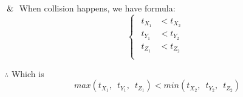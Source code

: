 $\And$ When collision happens,  we have formula:
\[
\left\{
\begin{array}{lr}
\begin{aligned}
t_{X_1} &< t_{X_2}\\
t_{Y_1} &< t_{Y_2}\\
t_{Z_1} &< t_{Z_2}\\
\end{aligned}
\end{array}
\right.
\]

$\therefore$ Which is
\begin{equation}
\label{equ:ray-box-3d-intersection}
max(t_{X_1},\enspace t_{Y_1},\enspace t_{Z_1}) < min(t_{X_2},\enspace t_{Y_2},\enspace t_{Z_2})
\end{equation}


